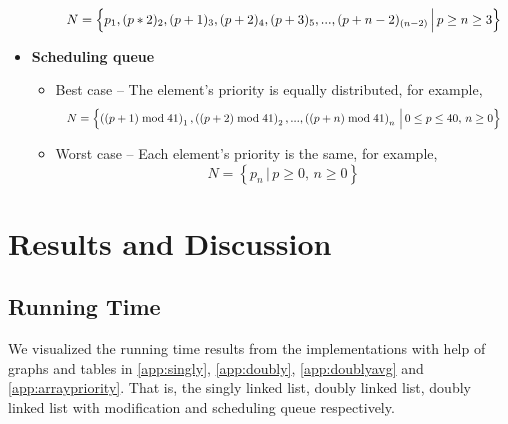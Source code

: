 \documentclass[a4paper,11pt]{kth-mag}
\begin{document}
\begin{itemize}
\begin{itemize}
                \begin{equation*}
                    \resizebox{.9\hsize}{!}{$N = \left\{p_1, (p*2)_2, (p+1)_3, (p+2)_4, (p+3)_5,..., (p+n-2)_{(n-2)} \, \Big| \, p \ge n \ge 3 \right\}$}
                \end{equation*}
        \end{itemize}
    \item \textbf{Scheduling queue}
        \begin{itemize}
            \item Best case -- The element's priority is equally distributed, for example,
                \begin{equation*}
                    \resizebox{.9\hsize}{!}{$N = \left\{\left((p+1) \bmod 41\right)_1, \left((p+2) \bmod 41\right)_2,..., \left((p+n) \bmod 41\right)_n \, \Big| \, 0 \le p \le 40, \, n \ge 0\right\}$}
                \end{equation*}
            \item Worst case -- Each element's priority is the same, for example,
                \begin{equation*}
                    N = \left\{p_{n} \, \Big| \, p \ge 0,\, n \ge 0 \right\}
                \end{equation*}
        \end{itemize}
\end{itemize}


\chapter{Results and Discussion}

\section{Running Time}
We visualized the running time results from the implementations with help of graphs and tables in \cref{app:singly}, \cref{app:doubly}, \cref{app:doublyavg} and \cref{app:arraypriority}.
That is, the singly linked list, doubly linked list, doubly linked list with modification and scheduling queue respectively.
\end{document}
